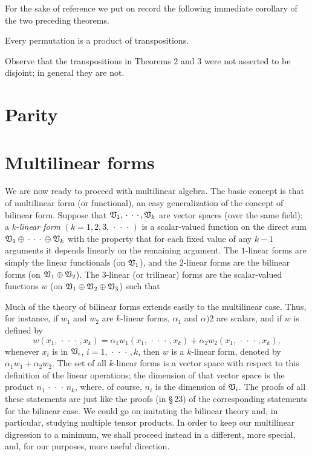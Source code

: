 For the sake of reference we put on record the following immediate corollary of the two preceding theorems.

\begin{theorem}
    Every permutation is a product of transpositions.
\end{theorem}

Observe that the transpositions in Theorems 2 and 3 were not asserted to be
disjoint; in general they are not.

\section{Parity}


\section{Multilinear forms}

We are now ready to proceed with multilinear algebra. The basic concept is that of multilinear form (or functional), an easy generalization of the concept of bilinear form. Suppose that \(\mathfrak{V}_1, \,\cdot\,\cdot\,\cdot\,, \mathfrak{V}_k\) are vector spaces (over the same field); a \(k\)-\emph{linear form} \((k = 1, 2, 3, \,\cdot\,\cdot\,\cdot\,)\) is a scalar-valued function on the direct sum \(\mathfrak{V}_1 \oplus \,\cdot\,\cdot\,\cdot\, \oplus \mathfrak{V}_k\) with the property that for each fixed value of any \(k-1\) arguments it depends linearly on the remaining argument. The \(1\)-linear forms are simply the linear functionals (on \(\mathfrak{V}_1\)), and the \(2\)-linear forms are the bilinear forms (on \(\mathfrak{V}_1 \oplus \mathfrak{V}_2\)). The \(3\)-linear (or trilinear) forms are the scalar-valued functions \(w\) (on \(\mathfrak{V}_1 \oplus \mathfrak{V}_2 \oplus \mathfrak{V}_3\)) such that

Much of the theory of bilinear forms extends easily to the multilinear case. Thus, for instance, if \(w_1\) and \(w_2\) are \(k\)-linear forms, \(\alpha_1\) and \(\alpha)2\) are scalars, and if \(w\) is defined by
\begin{equation*}
    w(x_1, \,\cdot\,\cdot\,\cdot\,, x_k) = \alpha_1 w_1(x_1, \,\cdot\,\cdot\,\cdot\,, x_k) + \alpha_2 w_2(x_1, \,\cdot\,\cdot\,\cdot\,, x_k),
\end{equation*}
whenever \(x_i\) is in \(\mathfrak{V}_i\), \(i = 1, \,\cdot\,\cdot\,\cdot\,, k\), then \(w\) is a
\(k\)-linear form, denoted by \(\alpha_1 w_1 + \alpha_2 w_2\). The set of all
\(k\)-linear forms is a vector space with respect to this definition of the
linear operations; the dimension of that vector space is the product \(n_1
\,\cdot\,\cdot\,\cdot\, n_k\), where, of course, \(n_i\) is the dimension of \(\mathfrak{V}_i\). The
proofs of all these statements are just like the proofs (in \S\,23) of the
corresponding statements for the bilinear case. We could go on imitating the
bilinear theory and, in particular, studying multiple tensor products. In order
to keep our multilinear digression to a minimum, we shall proceed instead in a
different, more special, and, for our purposes, more useful direction.

